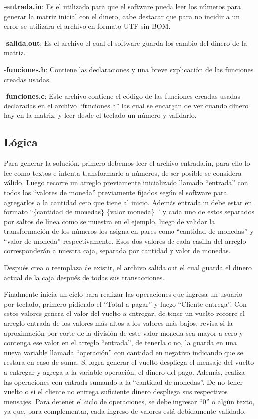 \documentclass[9pt,twocolumn,twoside]{optica}
\begin{document}
-\textbf{entrada.in}: Es el utilizado para que el software pueda leer los números para generar la matriz inicial con el dinero, cabe destacar que para no incidir a un error se utilizara el archivo en formato UTF sin BOM.

-\textbf{salida.out}: Es el archivo el cual el software guarda los cambio del dinero de la matriz.

-\textbf{funciones.h}: Contiene las declaraciones y una breve explicación de las funciones creadas usadas.

-\textbf{funciones.c}: Este archivo contiene el código de las funciones creadas usadas declaradas en el archivo “funciones.h” las cual se encargan de ver cuando dinero hay en la matriz, y leer desde el teclado un número y validarlo.

\subsection{Lógica}

Para generar la solución, primero debemos leer el archivo entrada.in, para ello lo lee como textos e intenta transformarlo a números, de ser posible se considera válido.  Luego recorre un arreglo previamente inicializado llamado “entrada” con todos los “valores de moneda” previamente fijados según el software para agregarlos a la cantidad cero que tiene al inicio. Además entrada.in debe estar en formato “\{cantidad de monedas\} \{valor moneda\} ” y cada uno de estos separados por saltos de línea como se muestra en el ejemplo, luego de validar la transformación de los números los asigna en pares como “cantidad de monedas” y “valor de moneda” respectivamente. Esos dos valores de cada casilla del arreglo corresponderán a nuestra caja, separada por cantidad y valor de monedas.

Después crea o reemplaza de existir, el archivo salida.out el cual guarda el dinero actual de la caja después de todas sus transacciones.

Finalmente inicia un ciclo para realizar las operaciones que ingresa un usuario por teclado, primero pidiendo el “Total a pagar” y luego “Cliente entrega”. Con estos valores genera el valor del vuelto a entregar, de tener un vuelto recorre el arreglo entrada de los valores más altos a los valores más bajos, revisa si la aproximación por corte de la división de este valor moneda sea mayor a cero y contenga ese valor en el arreglo “entrada”, de tenerla o no, la guarda en una nueva variable llamada “operación” con cantidad en negativo indicando que se restara en caso de suma. Si logra generar el vuelto despliega el mensaje del vuelto a entregar y agrega a la variable operación, el dinero del pago. Además, realiza las operaciones con entrada sumando a la “cantidad de monedas”. De no tener vuelto o si el cliente no entrega suficiente dinero despliega sus respectivos mensajes. Para detener el ciclo de operaciones, se debe ingresar “0” o algún texto, ya que, para complementar, cada ingreso de valores está debidamente validado.
\end{document}
